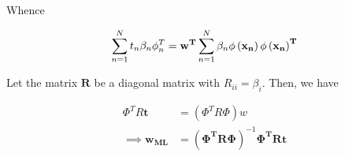 \documentclass[reqno]{amsart}
\begin{document}
\begin{enumerate}[label=\textbf{(\Roman*)}]
        Whence 

        \[ \sum_{n = 1}^{N} t_n \beta_n \phi_n^T = \mathbf{w^T}\sum_{n = 1}^{N} \beta_n \mathbf{\phi\left(x_n\right)\phi\left(x_n\right)^T}\]

        Let the matrix \(\mathbf{R}\) be a diagonal matrix with \(R_{ii} = \beta_i\). Then, we have

        \begin{align}
            \Phi^T R \mathbf{t} &= (\Phi^T R \Phi) w \\
            \implies \mathbf{w_{ML}} &= (\mathbf{\Phi^T R \Phi})^{-1} \mathbf{\Phi^T R t}
        \end{align}
        
    \end{enumerate}
\end{document}
